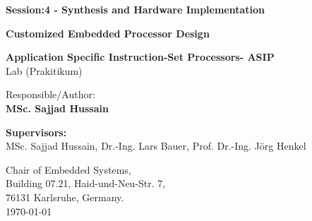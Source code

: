 \begin{titlepage}
\thispagestyle{empty}

\begin{center}
\hbox{}
\vfill

{\usesf\large
{\huge\bfseries Session:4 - Synthesis and Hardware Implementation }
\vskip 2.5cm

{\LARGE\bfseries Customized Embedded Processor Design}
\vskip 0.25cm

{\large\bfseries Application Specific Instruction-Set Processors- ASIP\\}
Lab (Prakitikum)
\vskip 1.5cm

Responsible/Author:  \\
{\large\bfseries MSc. Sajjad Hussain\\}

}
\end{center}
\vskip 3cm

\textbf{Supervisors:}  \\
{MSc. Sajjad Hussain,  Dr.-Ing. Lars Bauer, Prof. Dr.-Ing. Jörg Henkel\\}

\vskip 2cm
Chair of Embedded Systems,\\
Building 07.21, Haid-und-Neu-Str. 7, \\
76131 Karlsruhe, Germany. \\

\vskip 1cm
\rightline\today

\vfill
\end{titlepage}
